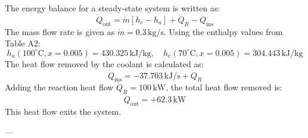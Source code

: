 The energy balance for a steady-state system is written as:  
\[
\dot{Q}_{\text{out}} = \dot{m} \left[ h_e - h_a \right] + \dot{Q}_R - \dot{Q}_{\text{ms}}
\]  
The mass flow rate is given as \( \dot{m} = 0.3 \, \text{kg/s} \). Using the enthalpy values from Table A2:  
\[
h_a(100^\circ\text{C}, x = 0.005) = 430.325 \, \text{kJ/kg}, \quad h_e(70^\circ\text{C}, x = 0.005) = 304.443 \, \text{kJ/kg}
\]  
The heat flow removed by the coolant is calculated as:  
\[
\dot{Q}_{\text{ms}} = -37.703 \, \text{kJ/s} + \dot{Q}_R
\]  
Adding the reaction heat flow \( \dot{Q}_R = 100 \, \text{kW} \), the total heat flow removed is:  
\[
\dot{Q}_{\text{out}} = +62.3 \, \text{kW}
\]  
This heat flow exits the system.

---